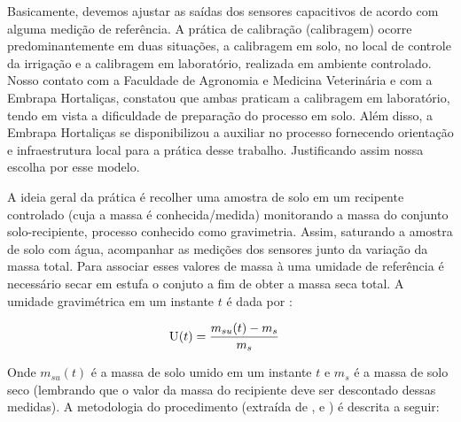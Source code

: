 		Basicamente, devemos ajustar as saídas dos sensores capacitivos de acordo com alguma medição de referência. A prática de calibração (calibragem) ocorre predominantemente em duas situações, a calibragem em solo, no local de controle da irrigação e a calibragem em laboratório, realizada em ambiente controlado. Nosso contato com a Faculdade de Agronomia e Medicina Veterinária e com a Embrapa Hortaliças, constatou que ambas praticam a calibragem em laboratório, tendo em vista a dificuldade de preparação do processo em solo. Além disso, a Embrapa Hortaliças se disponibilizou a auxiliar no processo fornecendo orientação e infraestrutura local para a prática desse trabalho. Justificando assim nossa escolha por esse modelo.
		
		A ideia geral da prática é recolher uma amostra de solo em um recipente controlado (cuja a massa é conhecida/medida) monitorando a massa do conjunto solo-recipiente, processo conhecido como gravimetria. Assim, saturando a amostra de solo com água, acompanhar as medições dos sensores junto da variação da massa total. Para associar esses valores de massa à uma umidade de referência é necessário secar em estufa o conjuto a fim de obter a massa seca total. A umidade gravimétrica em um instante $t$ é dada por \cite{bib_sen_02_ian}:
		
		\begin{align*}
			\textsc{U}(t) &= \frac{m_{su}(t)-m_{s}}{m_{s}} 
		\end{align*}
		
		Onde $m_{su}(t)$ é a massa de solo umido em um instante $t$ e $m_{s}$ é a massa de solo seco (lembrando que o valor da massa do recipiente deve ser descontado dessas medidas). A metodologia do procedimento (extraída de \cite{bib_sen_01_ian}, \cite{bib_sen_02_ian} e \cite{bib_sen_03_ian}) é descrita a seguir:
		

